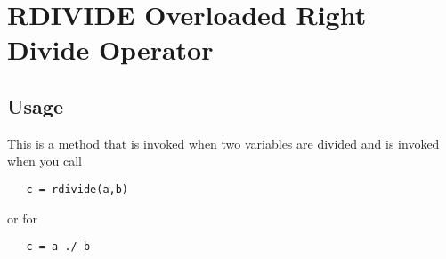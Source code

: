 \section{RDIVIDE Overloaded Right Divide Operator}

\subsection{Usage}

This is a method that is invoked when two variables are divided
and is invoked when you call
\begin{verbatim}
   c = rdivide(a,b)
\end{verbatim}
or for
\begin{verbatim}
   c = a ./ b
\end{verbatim}
